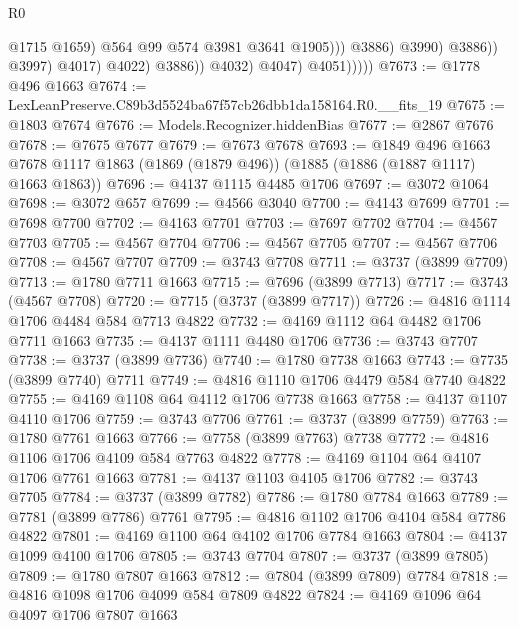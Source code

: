 \begin{lexlean}{R0}
\begin{coremodule}
                                            @1715
                                            @1659)
                                          @564
                                          @99
                                          @574
                                          @3981
                                          @3641
                                          @1905)))
                                    @3886)
                                  @3990)
                                @3886))
                            @3997)
                          @4017)
                        @4022)
                      @3886))
                  @4032)
                @4047)
              @4051)))))
@7673 := @1778 @496 @1663
@7674 := LexLeanPreserve.C89b3d5524ba67f57cb26dbb1da158164.R0.__fits_19
@7675 := @1803 @7674
@7676 := Models.Recognizer.hiddenBias
@7677 := @2867 @7676
@7678 := @7675 @7677
@7679 := @7673 @7678
@7693 := @1849
    @496
    @1663
    @7678
    @1117
    @1863
    (@1869 (@1879 @496))
    (@1885 (@1886 (@1887 @1117) @1663 @1863))
@7696 := @4137 @1115 @4485 @1706
@7697 := @3072 @1064
@7698 := @3072 @657
@7699 := @4566 @3040
@7700 := @4143 @7699
@7701 := @7698 @7700
@7702 := @4163 @7701
@7703 := @7697 @7702
@7704 := @4567 @7703
@7705 := @4567 @7704
@7706 := @4567 @7705
@7707 := @4567 @7706
@7708 := @4567 @7707
@7709 := @3743 @7708
@7711 := @3737 (@3899 @7709)
@7713 := @1780 @7711 @1663
@7715 := @7696 (@3899 @7713)
@7717 := @3743 (@4567 @7708)
@7720 := @7715 (@3737 (@3899 @7717))
@7726 := @4816 @1114 @1706 @4484 @584 @7713 @4822
@7732 := @4169 @1112 @64 @4482 @1706 @7711 @1663
@7735 := @4137 @1111 @4480 @1706
@7736 := @3743 @7707
@7738 := @3737 (@3899 @7736)
@7740 := @1780 @7738 @1663
@7743 := @7735 (@3899 @7740) @7711
@7749 := @4816 @1110 @1706 @4479 @584 @7740 @4822
@7755 := @4169 @1108 @64 @4112 @1706 @7738 @1663
@7758 := @4137 @1107 @4110 @1706
@7759 := @3743 @7706
@7761 := @3737 (@3899 @7759)
@7763 := @1780 @7761 @1663
@7766 := @7758 (@3899 @7763) @7738
@7772 := @4816 @1106 @1706 @4109 @584 @7763 @4822
@7778 := @4169 @1104 @64 @4107 @1706 @7761 @1663
@7781 := @4137 @1103 @4105 @1706
@7782 := @3743 @7705
@7784 := @3737 (@3899 @7782)
@7786 := @1780 @7784 @1663
@7789 := @7781 (@3899 @7786) @7761
@7795 := @4816 @1102 @1706 @4104 @584 @7786 @4822
@7801 := @4169 @1100 @64 @4102 @1706 @7784 @1663
@7804 := @4137 @1099 @4100 @1706
@7805 := @3743 @7704
@7807 := @3737 (@3899 @7805)
@7809 := @1780 @7807 @1663
@7812 := @7804 (@3899 @7809) @7784
@7818 := @4816 @1098 @1706 @4099 @584 @7809 @4822
@7824 := @4169 @1096 @64 @4097 @1706 @7807 @1663

\end{coremodule}
\end{lexlean}
